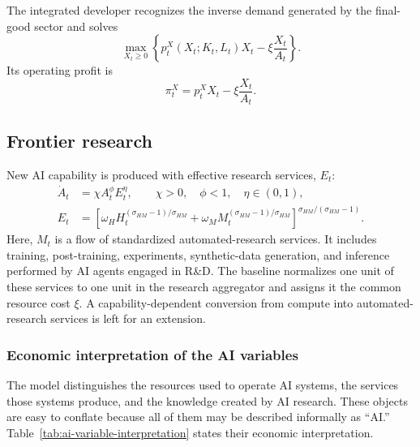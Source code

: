 The integrated developer recognizes the inverse demand generated by the final-good
sector and solves
\begin{equation}
    \max_{X_t\geq0}
    \left\{
        p^X_t(X_t;K_t,L_t)X_t
        -\xi\frac{X_t}{A_t}
    \right\}.
    \label{eq:monopoly-service-problem}
\end{equation}
Its operating profit is
\begin{equation}
    \pi^X_t=p^X_tX_t-\xi\frac{X_t}{A_t}.
    \label{eq:operating-profit}
\end{equation}

\subsection{Frontier research}

New AI capability is produced with effective research services, $E_t$:
\begin{align}
    \dot A_t
    &=
    \chi A_t^\phi E_t^\eta,
    \qquad \chi>0,\quad \phi<1,\quad \eta\in(0,1),
    \label{eq:ideas}\\
    E_t
    &=
    \left[
        \omega_H H_t^{(\sigma_{HM}-1)/\sigma_{HM}}
        +\omega_M M_t^{(\sigma_{HM}-1)/\sigma_{HM}}
    \right]^{\sigma_{HM}/(\sigma_{HM}-1)}.
    \label{eq:effective-research}
\end{align}
Here, $M_t$ is a flow of standardized automated-research services. It includes
training, post-training, experiments, synthetic-data generation, and inference
performed by AI agents engaged in R\&D. The baseline normalizes one unit of these
services to one unit in the research aggregator and assigns it the common resource
cost $\xi$. A capability-dependent conversion from compute into automated-research
services is left for an extension.

\subsubsection{Economic interpretation of the AI variables}

The model distinguishes the resources used to operate AI systems, the services those
systems produce, and the knowledge created by AI research. These objects are easy to
conflate because all of them may be described informally as ``AI.''
Table~\ref{tab:ai-variable-interpretation} states their economic interpretation.

